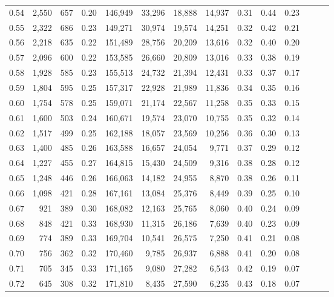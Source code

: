 \begin{tabular}{rrrrrrrrrrrrrr}
0.54 &  2,550 &  657 &  0.20 &  146,949 &   33,296 &  18,888 &  14,937 &  0.31 &  0.44 &      0.23 \\
0.55 &  2,322 &  686 &  0.23 &  149,271 &   30,974 &  19,574 &  14,251 &  0.32 &  0.42 &      0.21 \\
0.56 &  2,218 &  635 &  0.22 &  151,489 &   28,756 &  20,209 &  13,616 &  0.32 &  0.40 &      0.20 \\
0.57 &  2,096 &  600 &  0.22 &  153,585 &   26,660 &  20,809 &  13,016 &  0.33 &  0.38 &      0.19 \\
0.58 &  1,928 &  585 &  0.23 &  155,513 &   24,732 &  21,394 &  12,431 &  0.33 &  0.37 &      0.17 \\
0.59 &  1,804 &  595 &  0.25 &  157,317 &   22,928 &  21,989 &  11,836 &  0.34 &  0.35 &      0.16 \\
0.60 &  1,754 &  578 &  0.25 &  159,071 &   21,174 &  22,567 &  11,258 &  0.35 &  0.33 &      0.15 \\
0.61 &  1,600 &  503 &  0.24 &  160,671 &   19,574 &  23,070 &  10,755 &  0.35 &  0.32 &      0.14 \\
0.62 &  1,517 &  499 &  0.25 &  162,188 &   18,057 &  23,569 &  10,256 &  0.36 &  0.30 &      0.13 \\
0.63 &  1,400 &  485 &  0.26 &  163,588 &   16,657 &  24,054 &   9,771 &  0.37 &  0.29 &      0.12 \\
0.64 &  1,227 &  455 &  0.27 &  164,815 &   15,430 &  24,509 &   9,316 &  0.38 &  0.28 &      0.12 \\
0.65 &  1,248 &  446 &  0.26 &  166,063 &   14,182 &  24,955 &   8,870 &  0.38 &  0.26 &      0.11 \\
0.66 &  1,098 &  421 &  0.28 &  167,161 &   13,084 &  25,376 &   8,449 &  0.39 &  0.25 &      0.10 \\
0.67 &    921 &  389 &  0.30 &  168,082 &   12,163 &  25,765 &   8,060 &  0.40 &  0.24 &      0.09 \\
0.68 &    848 &  421 &  0.33 &  168,930 &   11,315 &  26,186 &   7,639 &  0.40 &  0.23 &      0.09 \\
0.69 &    774 &  389 &  0.33 &  169,704 &   10,541 &  26,575 &   7,250 &  0.41 &  0.21 &      0.08 \\
0.70 &    756 &  362 &  0.32 &  170,460 &    9,785 &  26,937 &   6,888 &  0.41 &  0.20 &      0.08 \\
0.71 &    705 &  345 &  0.33 &  171,165 &    9,080 &  27,282 &   6,543 &  0.42 &  0.19 &      0.07 \\
0.72 &    645 &  308 &  0.32 &  171,810 &    8,435 &  27,590 &   6,235 &  0.43 &  0.18 &      0.07 \\

\end{tabular}

